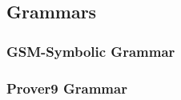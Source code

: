 






\subsection{Grammars}
\subsubsection{GSM-Symbolic Grammar}
\label{sec:gsm_grammar}





\subsubsection{Prover9 Grammar}
\label{sec:prover9_grammar}





